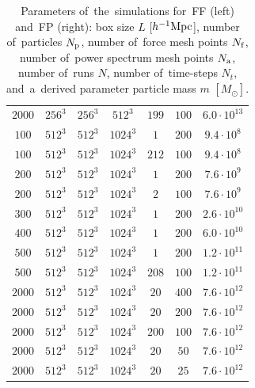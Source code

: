 \begin{landscape}
\begin{table}
{\begin{tabular}{ ccccccc }
    $2000$ & $256^3$ & $256^3$ & $512^3$ & $199$ & $100$ & $6.0\cdot10^{13}$\\
    $100$ & $512^3$ & $512^3$ & $1024^3$ & $1$ & $200$ & $9.4\cdot10^{8}$\\
    $100$ & $512^3$ & $512^3$ & $1024^3$ & $212$ & $100$ & $9.4\cdot10^{8}$\\
    $200$ & $512^3$ & $512^3$ & $1024^3$ & $1$ & $200$ & $7.6\cdot10^{9}$\\
    $200$ & $512^3$ & $512^3$ & $1024^3$ & $2$ & $100$ & $7.6\cdot10^{9}$\\
    $300$ & $512^3$ & $512^3$ & $1024^3$ & $1$ & $200$ & $2.6\cdot10^{10}$\\
    $400$ & $512^3$ & $512^3$ & $1024^3$ & $1$ & $200$ & $6.0\cdot10^{10}$\\
    $500$ & $512^3$ & $512^3$ & $1024^3$ & $1$ & $200$ & $1.2\cdot10^{11}$\\
    $500$ & $512^3$ & $512^3$ & $1024^3$ & $208$ & $100$ & $1.2\cdot10^{11}$\\
    $2000$ & $512^3$ & $512^3$ & $1024^3$ & $20$ & $400$ & $7.6\cdot10^{12}$\\
    $2000$ & $512^3$ & $512^3$ & $1024^3$ & $20$ & $200$ & $7.6\cdot10^{12}$\\
    $2000$ & $512^3$ & $512^3$ & $1024^3$ & $200$ & $100$ & $7.6\cdot10^{12}$\\
    $2000$ & $512^3$ & $512^3$ & $1024^3$ & $20$ & $50$ & $7.6\cdot10^{12}$\\
    $2000$ & $512^3$ & $512^3$ & $1024^3$ & $20$ & $25$ & $7.6\cdot10^{12}$\\
    \hline
    \end{tabular}
    }
    \caption{Parameters of~the~simulations for~FF (left) and~FP (right): box size $L$ [$h^{-1}\text{Mpc}$], number of~particles $N_{\rm p}$, number of~force mesh points $N_{\rm f}$, number of~power spectrum mesh points $N_{\rm a}$, number of~runs $N$, number of~time-steps $N_t$, and~a~derived parameter particle mass $m$ $[M_\odot]$.}
    \label{tab:sim_param_FF_FP}
    \end{table}


\end{landscape}
